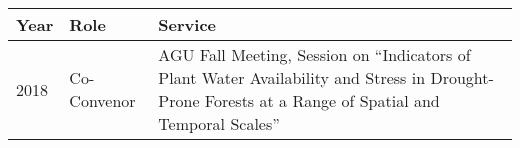 
\begin{longtable}{llp{12cm}}
Year & Role & Service\\
\hline 
\endhead 
2018 & Co-Convenor & AGU Fall Meeting, Session on “Indicators of Plant Water Availability and Stress in Drought-Prone Forests at a Range of Spatial and Temporal Scales” \\
\end{longtable}


